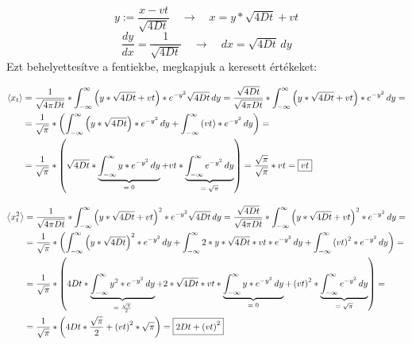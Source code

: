 \begin{equation*}
    y := \frac{x - vt}{\sqrt{4Dt}} \quad \to \quad x = y * \sqrt{4Dt} + vt
\end{equation*}
\begin{equation*}
    \frac{dy}{dx} = \frac{1}{\sqrt{4Dt}} \quad \to \quad dx = \sqrt{4Dt}\, dy
\end{equation*}
Ezt behelyettesítve a fentiekbe, megkapjuk a keresett értékeket:

\begin{align} \label{eq:37}
    \left< x_{t} \right>
    &=
    \frac{1}{\sqrt{4 \pi D t}} * \int_{- \infty}^{\infty} \left( y * \sqrt{4Dt} + vt \right) * e^{-y^{2}} \sqrt{4Dt}\, dy
    =
    \frac{\sqrt{4Dt}}{\sqrt{4 \pi D t}} * \int_{- \infty}^{\infty} \left( y * \sqrt{4Dt} + vt \right) * e^{-y^{2}}\, dy = \nonumber \\
    &=
    \frac{1}{\sqrt{\pi}} * \left( \int_{- \infty}^{\infty} \left( y * \sqrt{4Dt} \right) * e^{-y^{2}}\, dy + \int_{- \infty}^{\infty} \left( vt \right) * e^{-y^{2}}\, dy \right) = \nonumber \\
    &=
    \frac{1}{\sqrt{\pi}} * \left( \sqrt{4Dt} * \underbrace{\int_{- \infty}^{\infty} y * e^{-y^{2}}\, dy}_{\text{\normalfont $= 0$}} + vt * \underbrace{\int_{- \infty}^{\infty} e^{-y^{2}}\, dy}_{\text{\normalfont $= \sqrt{\pi}$}} \right)
    =
    \frac{\sqrt{\pi}}{\sqrt{\pi}} * vt = \boxed{vt}
\end{align}

\begin{align} \label{eq:38}
    \left< x_{t}^{2} \right>
    &=
    \frac{1}{\sqrt{4 \pi D t}} * \int_{- \infty}^{\infty} \left( y * \sqrt{4Dt} + vt \right)^{2} * e^{-y^{2}} \sqrt{4Dt}\, dy
    =
    \frac{\sqrt{4Dt}}{\sqrt{4 \pi D t}} * \int_{- \infty}^{\infty} \left( y * \sqrt{4Dt} + vt \right)^{2} * e^{-y^{2}}\, dy = \nonumber \\
    &=
    \frac{1}{\sqrt{\pi}} * \left( \int_{- \infty}^{\infty} \left( y * \sqrt{4Dt} \right)^{2} * e^{-y^{2}}\, dy
    +
    \int_{- \infty}^{\infty} 2 * y * \sqrt{4Dt} * vt * e^{-y^{2}}\, dy
    +
    \int_{- \infty}^{\infty} \left( vt \right)^{2} * e^{-y^{2}}\, dy \right) = \nonumber \\
    &=
    \frac{1}{\sqrt{\pi}} * \left( 4Dt * \underbrace{\int_{- \infty}^{\infty} y^{2} * e^{-y^{2}}\, dy}_{\text{\normalfont $= \frac{\sqrt{\pi}}{2}$}}
    +
    2 * \sqrt{4Dt} * vt * \underbrace{\int_{- \infty}^{\infty} y * e^{-y^{2}}\, dy}_{\text{\normalfont $= 0$}}
    +
    \left( vt \right)^{2} * \underbrace{\int_{- \infty}^{\infty} e^{-y^{2}}\, dy}_{\text{\normalfont $= \sqrt{\pi}$}} \right) = \nonumber \\
    &=
    \frac{1}{\sqrt{\pi}} * \left( 4Dt * \frac{\sqrt{\pi}}{2}
    +
    \left( vt \right)^{2} * \sqrt{\pi} \right)
    =
    \boxed{2Dt + \left( vt \right)^{2}}
\end{align}

